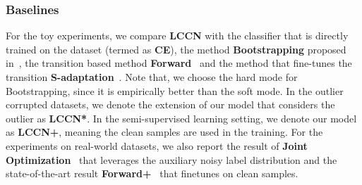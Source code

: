 \documentclass[journal]{IEEEtran}
\begin{document}
 \begin{table*} [t]
\centering
\caption{The average accuracy () over 5 trials on outlier-corrupted CIFAR-10 and CIFAR-100 with different noise levels.} 
{
}
\label{tab:cifar-outlier}
\end{table*}

\subsubsection{Baselines} For the toy experiments, we compare \textbf{LCCN} with the classifier that is directly trained on the dataset (termed as \textbf{CE}), the method \textbf{Bootstrapping} proposed in~\cite{reed2014training}, the transition based method \textbf{Forward}~\cite{patrini2017making} and the method that fine-tunes the transition \textbf{S-adaptation}~\cite{goldberger2016training}. Note that, we choose the hard mode for Bootstrapping, since it is empirically better than the soft mode. In the outlier corrupted datasets, we denote the extension of our model that considers the outlier as \textbf{LCCN*}. In the semi-supervised learning setting, we denote our model as \textbf{LCCN+}, meaning the clean samples are used in the training. For the experiments on real-world datasets, we also report the result of \textbf{Joint Optimization}~\cite{tanaka2018joint} that leverages the auxiliary noisy label distribution and the state-of-the-art result \textbf{Forward+}~\cite{patrini2017making} that finetunes on clean samples.
\end{document}
